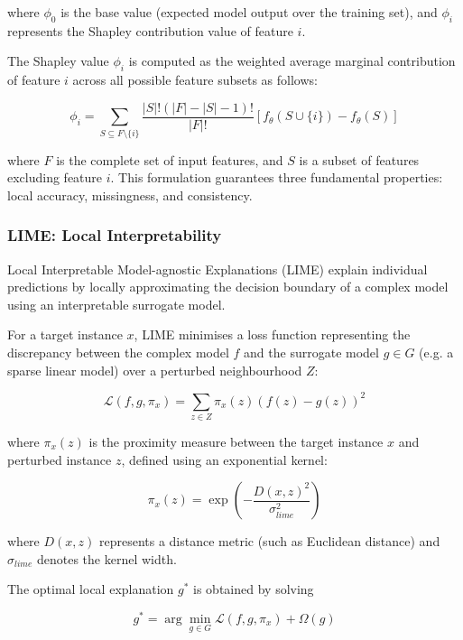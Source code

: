 \documentclass[a4paper,fleqn]{cas-sc}
\begin{document}
where $\phi_0$ is the base value (expected model output over the training set), and $\phi_i$ represents the Shapley contribution value of feature $i$.

The Shapley value $\phi_i$ is computed as the weighted average marginal contribution of feature $i$ across all possible feature subsets as follows:

\begin{equation}
\phi_i = \sum_{S \subseteq F \setminus \{i\}} \frac{|S|!(|F|-|S|-1)!}{|F|!} \left[ f_\theta(S \cup \{i\}) - f_\theta(S) \right]
\end{equation}

where $F$ is the complete set of input features, and $S$ is a subset of features excluding feature $i$. This formulation guarantees three fundamental properties: local accuracy, missingness, and consistency.

\subsubsection{LIME: Local Interpretability}

Local Interpretable Model-agnostic Explanations (LIME) explain individual predictions by locally approximating the decision boundary of a complex model using an interpretable surrogate model.

For a target instance $x$, LIME minimises a loss function representing the discrepancy between the complex model $f$ and the surrogate model $g \in G$ (e.g. a sparse linear model) over a perturbed neighbourhood $Z$:

\begin{equation}
\mathcal{L}(f, g, \pi_x) = \sum_{z \in Z} \pi_x(z) \left( f(z) - g(z) \right)^2
\end{equation}

where $\pi_x(z)$ is the proximity measure between the target instance $x$ and perturbed instance $z$, defined using an exponential kernel:

\begin{equation}
\pi_x(z) = \exp \left( -\frac{D(x,z)^2}{\sigma_{lime}^2} \right)
\end{equation}

where $D(x,z)$ represents a distance metric (such as Euclidean distance) and $\sigma_{lime}$ denotes the kernel width.

The optimal local explanation $g^*$ is obtained by solving

\begin{equation}
g^* = \arg\min_{g \in G} \mathcal{L}(f, g, \pi_x) + \Omega(g)
\end{equation}
\end{document}
